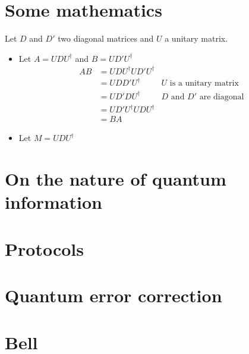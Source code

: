 \documentclass[12pt]{article}
\theoremstyle{exostyle}
\begin{document}
\section{Some mathematics}


Let $D$ and $D'$ two diagonal matrices and $U$ a unitary matrix.

\begin{itemize}
  \item Let $A = UDU^\dagger$ and $B=UD'U^\dagger$
    \begin{align*}
      AB &= UDU^\dagger UD'U^\dagger \\
        &= UDD'U^\dagger & \text{$U$ is a unitary matrix} \\
        &= UD'DU^\dagger & \text{$D$ and $D'$ are diagonal} \\
        &= UD'U^\dagger UDU^\dagger \\
        &= BA
    \end{align*}

  \item Let $M = UDU^\dagger$
\end{itemize}

\section{On the nature of quantum information}

\section{Protocols}

\section{Quantum error correction}

\section{Bell}
\end{document}
